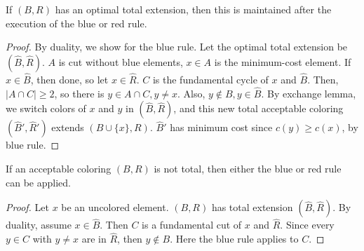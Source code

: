 \begin{mylemma}
If $(B,R)$ has an optimal total extension, then this is maintained after the execution of the blue or red rule.
\end{mylemma}
\begin{proof}
By duality, we show for the blue rule. Let the optimal total extension be $(\hat{B}, \hat{R})$. $A$ is cut without blue elements, $x \in A$ is the minimum-cost element. If $x \in \hat{B}$, then done, so let $x \in \hat{R}$. $C$ is the fundamental cycle of $x$ and $\hat{B}$. Then, $|A \cap C| \ge 2$, so there is $y \in A \cap C, y \neq x$. Also, $y \notin B, y \in \hat{B}$. By exchange lemma, we switch colors of $x$ and $y$ in $(\hat{B}, \hat{R})$, and this new total acceptable coloring $(\hat{B}', \hat{R}')$ extends $(B \cup \{x\}, R)$. $\hat{B}'$ has minimum cost since $c(y) \ge c(x)$, by blue rule.
\end{proof}

\begin{mylemma}
If an acceptable coloring $(B, R)$ is not total, then either the blue or red rule can be applied.
\end{mylemma}
\begin{proof}
Let $x$ be an uncolored element. $(B,R)$ has total extension $(\hat{B}, \hat{R})$. By duality, assume $x \in \hat{B}$. Then $C$ is a fundamental cut of $x$ and $\hat{R}$. Since every $y \in C$ with $y \neq x$ are in $\hat{R}$, then $y \notin B$. Here the blue rule applies to $C$.
\end{proof}


